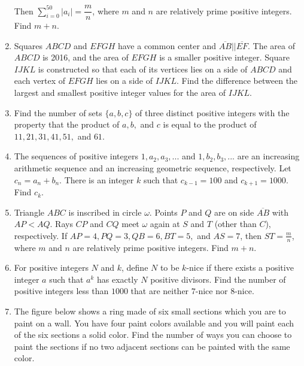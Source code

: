 \documentclass{article}
\begin{document}
\begin{enumerate}[label=\arabic*., itemsep=0.5em]
Then \(\sum_{i=0}^{50} |a_i|=\dfrac{m}{n}\), where \(m\) and \(n\) are relatively prime positive integers. Find \(m+n\).\par \vspace{0.5em}\item Squares \(ABCD\) and \(EFGH\) have a common center and \(\overline{AB} || \overline{EF}\). The area of \(ABCD\) is 2016, and the area of \(EFGH\) is a smaller positive integer. Square \(IJKL\) is constructed so that each of its vertices lies on a side of \(ABCD\) and each vertex of \(EFGH\) lies on a side of \(IJKL\). Find the difference between the largest and smallest positive integer values for the area of \(IJKL\).\par \vspace{0.5em}\item Find the number of sets \(\{a,b,c\}\) of three distinct positive integers with the property that the product of \(a,b,\) and \(c\) is equal to the product of \(11,21,31,41,51,\) and \(61\).\par \vspace{0.5em}\item The sequences of positive integers \(1,a_2, a_3,...\) and \(1,b_2, b_3,...\) are an increasing arithmetic sequence and an increasing geometric sequence, respectively. Let \(c_n=a_n+b_n\). There is an integer \(k\) such that \(c_{k-1}=100\) and \(c_{k+1}=1000\). Find \(c_k\).\par \vspace{0.5em}\item Triangle \(ABC\) is inscribed in circle \(\omega\). Points \(P\) and \(Q\) are on side \(\overline{AB}\) with \(AP<AQ\). Rays \(CP\) and \(CQ\) meet \(\omega\) again at \(S\) and \(T\) (other than \(C\)), respectively. If \(AP=4,PQ=3,QB=6,BT=5,\) and \(AS=7\), then \(ST=\frac{m}{n}\), where \(m\) and \(n\) are relatively prime positive integers. Find \(m+n\).\par \vspace{0.5em}\item For positive integers \(N\) and \(k\), define \(N\) to be \(k\)-nice if there exists a positive integer \(a\) such that \(a^{k}\) has exactly \(N\) positive divisors. Find the number of positive integers less than \(1000\) that are neither \(7\)-nice nor \(8\)-nice.\par \vspace{0.5em}\item The figure below shows a ring made of six small sections which you are to paint on a wall. You have four paint colors available and you will paint each of the six sections a solid color. Find the number of ways you can choose to paint the sections if no two adjacent sections can be painted with the same color.



\end{enumerate}
\end{document}
